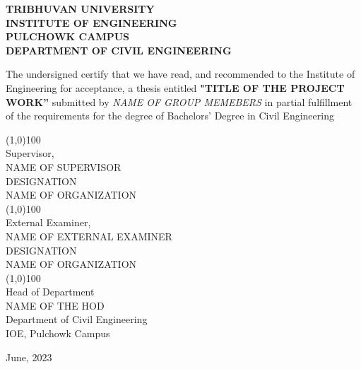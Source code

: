 \documentclass{report}
\begin{document}
\pagestyle{empty}
{
\begin{center}
\textbf{\MakeUppercase{Tribhuvan University}}\\
\textbf{\MakeUppercase{Institute of Engineering}}\\
\textbf{\MakeUppercase{Pulchowk Campus}}\\
\textbf{\MakeUppercase{Department of Civil Engineering}}\\
\end{center}
\begin{flushleft}
The undersigned certify that we have read, and recommended to the Institute of Engineering for acceptance, a thesis entitled \textbf{"TITLE OF THE PROJECT WORK”} submitted by \textsl{NAME OF GROUP MEMEBERS} in partial fulfillment of the requirements for the degree of Bachelors' Degree in Civil Engineering
\vspace{0.3cm}
\end{flushleft}
\begin{flushright}
	\line (1,0){100} \\
	Supervisor,\\
	NAME OF SUPERVISOR\\
	DESIGNATION\\
	NAME OF ORGANIZATION\\
	\vspace{1.5cm}
	\vfill
	\line (1,0){100} \\
	External Examiner,\\
	NAME OF EXTERNAL EXAMINER\\
	DESIGNATION\\
	NAME OF ORGANIZATION\\	
	\vspace{1.5cm}
	\vfill
	\line (1,0){100} \\
	Head of Department\\
	NAME OF THE HOD\\
	Department of Civil Engineering\\
	IOE, Pulchowk Campus\\
		
\end{flushright}

\vfill

\begin{center}
	June, 2023
\end{center}

}
\clearpage
\end{document}
